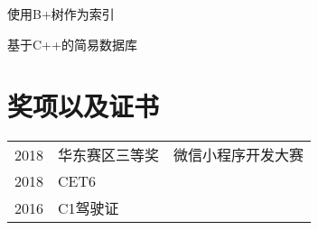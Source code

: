 \documentclass[]{deedy-resume-openfont}
\begin{document}
\begin{minipage}[t]{0.68\textwidth}
\begin{tightemize}
    \item 使用B+树作为索引
    \item 基于C++的简易数据库
\end{tightemize}
\sectionsep






\section{奖项以及证书} 
\begin{tabular}{rll}
2018         & 华东赛区三等奖  & 微信小程序开发大赛 \\
2018         & CET6 \\
2016         & C1驾驶证
\end{tabular}
\sectionsep



\end{minipage}
\end{document}
